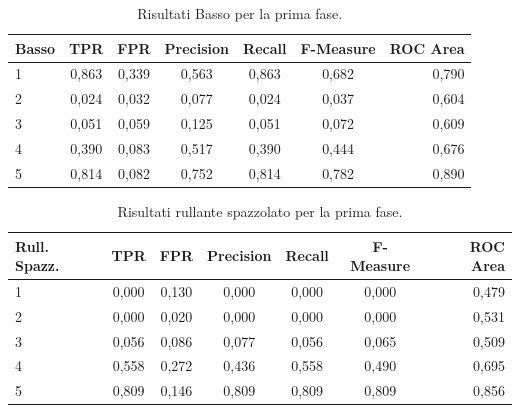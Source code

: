 \begin{table}[h!]
	\begin{center}
		\begin{tabular}{l|c|c|c|c|c|r} %
			\textbf{Basso} & \textbf{TPR} & \textbf{FPR} & \textbf{Precision} & \textbf{Recall} & \textbf{F-Measure} & \textbf{ROC Area}\\
			\hline
			1 & 0,863 & 0,339 & 0,563 & 0,863 & 0,682 & 0,790 \\
			2 & 0,024 & 0,032 & 0,077 & 0,024 & 0,037 & 0,604 \\
			3 & 0,051 & 0,059 & 0,125 & 0,051 & 0,072 & 0,609 \\
			4 & 0,390 & 0,083 & 0,517 & 0,390 & 0,444 & 0,676 \\
			5 & 0,814 & 0,082 & 0,752 & 0,814 & 0,782 & 0,890
		\end{tabular}
		\caption{Risultati Basso per la prima fase.}
		\label{tab:cb_res_2}
	\end{center}
\end{table}

\begin{table}[h!]
	\begin{center}
		\begin{tabular}{l|c|c|c|c|c|r} %
			\textbf{Rull. Spazz.} & \textbf{TPR} & \textbf{FPR} & \textbf{Precision} & \textbf{Recall} & \textbf{F-Measure} & \textbf{ROC Area}\\
			\hline
			1 & 0,000 & 0,130 & 0,000 & 0,000 & 0,000 & 0,479 \\
			2 & 0,000 & 0,020 & 0,000 & 0,000 & 0,000 & 0,531 \\
			3 & 0,056 & 0,086 & 0,077 & 0,056 & 0,065 & 0,509 \\
			4 & 0,558 & 0,272 & 0,436 & 0,558 & 0,490 & 0,695 \\
			5 & 0,809 & 0,146 & 0,809 & 0,809 & 0,809 & 0,856 \\
		\end{tabular}
		\caption{Risultati rullante spazzolato per la prima fase.}
		\label{tab:sn_brush_res_2}
	\end{center}
\end{table}

